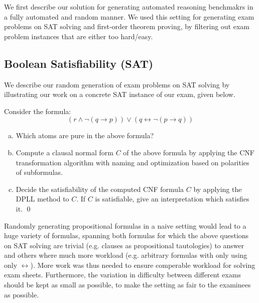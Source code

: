 We first describe our solution for generating automated reasoning
benchmakrs in a fully automated and random manner. We used this
setting for generating exam problems on SAT solving and first-order
theorem proving, by 
 filtering out exam problem instances that are either too hard/easy. 

 \subsection{Boolean Satisfiability (SAT)}\label{sec:sat}
We describe our random generation of exam problems on SAT solving by
illustrating our work on a concrete SAT instance of our exam, given
below.

\begin{mdframed}
    \begin{example}\label{ex:sat}
        Consider the formula:
        \[
            ( r \land \lnot ( q \rightarrow p ) ) \lor ( q \leftrightarrow \lnot ( p \rightarrow q ) )
        \]
        \begin{enumerate}[(a)]
            \item
                Which atoms are pure in the above formula?
            \item\label{subtask:sat-cnf}
                Compute a clausal normal form $C$ of the above formula by
                applying the CNF transformation algorithm with naming and
                optimization based on polarities of subformulas.
            \item
                Decide the satisfiability of the computed CNF formula $C$
                by applying the DPLL method to $C$. If $C$ is
                satisfiable, give an interpretation which
                satisfies it.
                \qed
        \end{enumerate}
    \end{example}
\end{mdframed}

 
Randomly generating propositional formulas in a naive setting would lead
to a huge variety of formulas,
spanning both formulas for which the above questions on SAT solving
are trivial (e.g. clauses as propositional tautologies) to answer
and others where much more workload  (e.g. arbitrary formulas with
only using only $\leftrightarrow$). More work was thus needed to
ensure comperable workload for solving exam sheets. 
Furthermore,
the variation in difficulty between different exams should be kept as small as possible,
to make the setting as fair to the examinees as possible.

